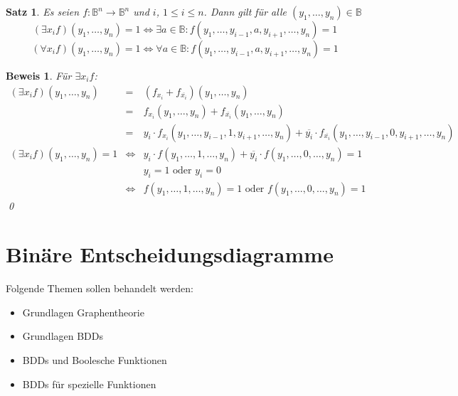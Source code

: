 \documentclass[ngerman]{scrartcl}
\theoremstyle{custom}
\newtheorem{ms}[mdef]{Satz}
\newtheorem*{bw}{Beweis}
\newcommand{\0}{\mathbf{0}}
\newcommand{\1}{\mathbf{L}}
\begin{document}
\begin{ms}
Es seien $f: \mathds{B}^n \rightarrow \mathds{B}^n$ und $i$, $1 \leq i
\leq n$. Dann gilt f\"ur alle $(y_1,\dots,y_n) \in \mathds{B}$
\begin{equation*}
(\exists x_i f)(y_1,\dots,y_n) =1 \Leftrightarrow \exists a \in
\mathds{B}: f(y_1,\dots,y_{i-1},a,y_{i+1},\dots, y_n) = 1
\end{equation*}
\begin{equation*}
(\forall x_i f)(y_1,\dots,y_n) =1 \Leftrightarrow \forall a \in
\mathds{B}: f(y_1,\dots,y_{i-1},a,y_{i+1},\dots, y_n) = 1
\end{equation*}
\end{ms}

\begin{bw}
F\"ur $\exists x_i f$:
\begin{eqnarray*}
(\exists x_i f)(y_1, \dots, y_n) &=& (f_{x_i} +
f_{\overline{x_i}})(y_1, \dots, y_n)\\
&=& f_{x_i}(y_1,\dots,y_n) + f_{\overline{x_i}}(y_1,\dots,y_n) \\
&=& y_i \cdot f_{x_i}(y_1,\dots,y_{i-1},1,y_{i+1},\dots,y_n) +
\overline{y_i} \cdot f_{\overline{x_i}}(y_1,\dots,
y_{i-1},0,y_{i+1},\dots, y_n)\\
(\exists x_i f)(y_1,\dots, y_n) = 1 &\Leftrightarrow& y_i \cdot
f(y_1,\dots, 1, \dots, y_n) + \overline{y_i} \cdot
f(y_1,\dots,0,\dots,y_n) =1 \\
&& y_i = 1 \text{ oder } y_i = 0 \\
&\Leftrightarrow& f(y_1,\dots,1,\dots,y_n) =1 \text{ oder }
f(y_1,\dots, 0, \dots, y_n) = 1
\end{eqnarray*}
\qed
\end{bw}

\newpage

\section{Bin\"are Entscheidungsdiagramme}
Folgende Themen sollen behandelt werden:
\begin{itemize}
\item Grundlagen Graphentheorie 
\item Grundlagen BDDs
\item BDDs und Boolesche Funktionen
\item BDDs f\"ur spezielle Funktionen
\end{itemize}
\end{document}
